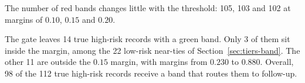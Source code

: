 The number of red bands changes little with the threshold: 105, 103 and 102
at margins of $0.10$, $0.15$ and $0.20$.

The gate leaves 14 true high-risk records with a green band. Only 3 of them
sit inside the margin, among the 22 low-risk near-ties of
Section~\ref{sec:tiers-band}. The other 11 are outside the $0.15$ margin, with
margins from $0.230$ to $0.880$. Overall, 98 of the 112 true high-risk records receive a band
that routes them to follow-up.
